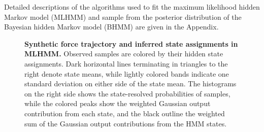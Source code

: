 \documentclass[aps,pre,twocolumn,superscriptaddress,nofootinbib,longbibliography]{revtex4-1}
\begin{document}
{{\color{red} Detailed descriptions of the algorithms used to fit the maximum likelihood hidden Markov model (MLHMM) and sample from the posterior distribution of the Bayesian hidden Markov model (BHMM) are given in the Appendix.}



\begin{figure}[tbp]
\noindent
\caption{{\bf Synthetic force trajectory and inferred state assignments in MLHMM.}
Observed samples are colored by their hidden state assignments.
Dark horizontal lines terminating in triangles to the right denote state means, while lightly colored bands indicate one standard deviation on either side of the state mean.
The histograms on the right side shows the state-resolved probabilities of samples, while the colored peaks show the weighted Gaussian output contribution from each state, and the black outline the weighted sum of the Gaussian output contributions from the HMM states.
\label{figure:model-stateassignments}}
\end{figure}

}
\end{document}
